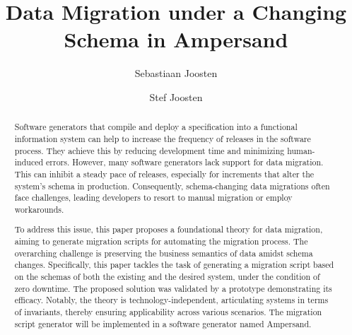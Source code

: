 \documentclass[runningheads]{llncs}
\begin{document}
%

\title{Data Migration under a Changing Schema in Ampersand}
%
%
\author{Sebastiaan Joosten\\ \and
Stef Joosten}
%
%
%
\maketitle              %
%
\begin{abstract}
   Software generators that compile and deploy a specification into a functional information system
   can help to increase the frequency of releases in the software process.
   They achieve this by reducing development time and minimizing human-induced errors.
   However, many software generators lack support for data migration.
   This can inhibit a steady pace of releases, especially for increments that alter the system's schema in production.
   Consequently, schema-changing data migrations often face challenges, leading developers to resort to manual migration or employ workarounds.

   To address this issue, this paper proposes a foundational theory for data migration,
   aiming to generate migration scripts for automating the migration process.
   The overarching challenge is preserving the business semantics of data amidst schema changes.
   Specifically, this paper tackles the task of generating a migration script based on the schemas of both the existing and the desired system,
   under the condition of zero downtime.
   The proposed solution was validated by a prototype demonstrating its efficacy.
   Notably, the theory is technology-independent, articulating systems in terms of invariants, thereby ensuring applicability across various scenarios.
   The migration script generator will be implemented in a software generator named Ampersand.
\end{abstract}
\end{document}
